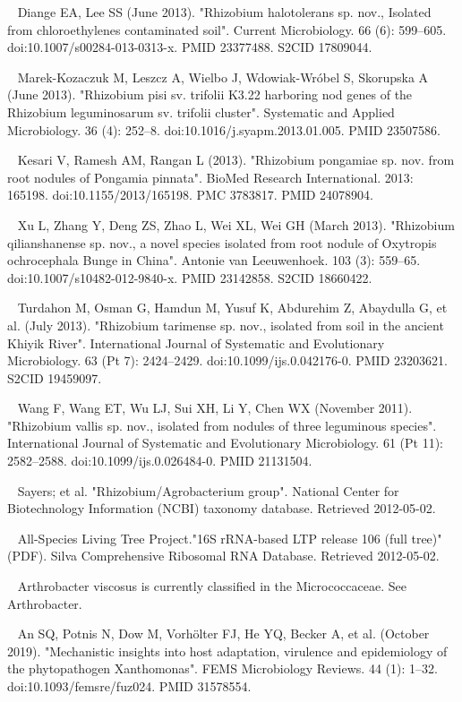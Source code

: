 \documentclass[11pt]{article}
\begin{document}
\begin{thebibliography}{3}
	~ Diange EA, Lee SS (June 2013). "Rhizobium halotolerans sp. nov., Isolated from chloroethylenes contaminated soil". Current Microbiology. 66 (6): 599–605. doi:10.1007/s00284-013-0313-x. PMID 23377488. S2CID 17809044.
	
	~ Marek-Kozaczuk M, Leszcz A, Wielbo J, Wdowiak-Wróbel S, Skorupska A (June 2013). "Rhizobium pisi sv. trifolii K3.22 harboring nod genes of the Rhizobium leguminosarum sv. trifolii cluster". Systematic and Applied Microbiology. 36 (4): 252–8. doi:10.1016/j.syapm.2013.01.005. PMID 23507586.
	
	~ Kesari V, Ramesh AM, Rangan L (2013). "Rhizobium pongamiae sp. nov. from root nodules of Pongamia pinnata". BioMed Research International. 2013: 165198. doi:10.1155/2013/165198. PMC 3783817. PMID 24078904.
	
	~ Xu L, Zhang Y, Deng ZS, Zhao L, Wei XL, Wei GH (March 2013). "Rhizobium qilianshanense sp. nov., a novel species isolated from root nodule of Oxytropis ochrocephala Bunge in China". Antonie van Leeuwenhoek. 103 (3): 559–65. doi:10.1007/s10482-012-9840-x. PMID 23142858. S2CID 18660422.
	
	~ Turdahon M, Osman G, Hamdun M, Yusuf K, Abdurehim Z, Abaydulla G, et al. (July 2013). "Rhizobium tarimense sp. nov., isolated from soil in the ancient Khiyik River". International Journal of Systematic and Evolutionary Microbiology. 63 (Pt 7): 2424–2429. doi:10.1099/ijs.0.042176-0. PMID 23203621. S2CID 19459097.
	
	~ Wang F, Wang ET, Wu LJ, Sui XH, Li Y, Chen WX (November 2011). "Rhizobium vallis sp. nov., isolated from nodules of three leguminous species". International Journal of Systematic and Evolutionary Microbiology. 61 (Pt 11): 2582–2588. doi:10.1099/ijs.0.026484-0. PMID 21131504.
	
	~ Sayers; et al. "Rhizobium/Agrobacterium group". National Center for Biotechnology Information (NCBI) taxonomy database. Retrieved 2012-05-02.
	
	~ All-Species Living Tree Project."16S rRNA-based LTP release 106 (full tree)" (PDF). Silva Comprehensive Ribosomal RNA Database. Retrieved 2012-05-02.

	~ Arthrobacter viscosus is currently classified in the Micrococcaceae. See Arthrobacter.
	
	~ An SQ, Potnis N, Dow M, Vorhölter FJ, He YQ, Becker A, et al. (October 2019). "Mechanistic insights into host adaptation, virulence and epidemiology of the phytopathogen Xanthomonas". FEMS Microbiology Reviews. 44 (1): 1–32. doi:10.1093/femsre/fuz024. PMID 31578554.
	

\end{thebibliography}
\end{document}
